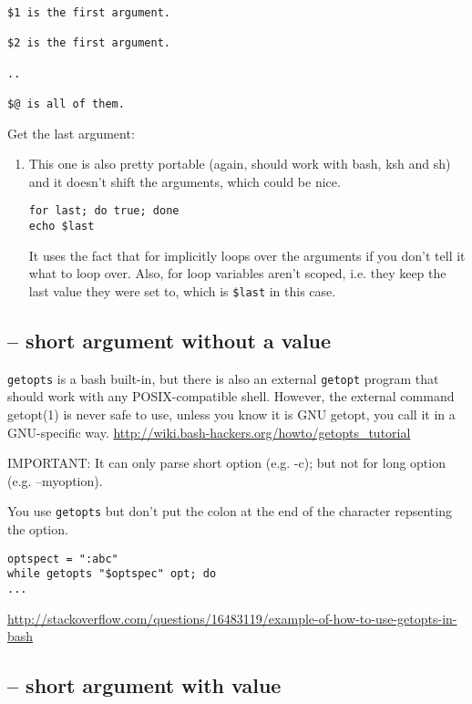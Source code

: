 
\begin{verbatim}
$1 is the first argument.

$2 is the first argument.

..

$@ is all of them.
\end{verbatim}

Get the last argument:
\begin{enumerate}
  \item  This one is also pretty portable (again, should work with bash, ksh and
  sh) and it doesn't shift the arguments, which could be nice.
\begin{verbatim}
for last; do true; done
echo $last
\end{verbatim}

It uses the fact that for implicitly loops over the arguments if you don't tell
it what to loop over. 
Also,  for loop variables aren't scoped, i.e. they keep the last value they were
set to, which is \verb!$last! in this case.
\end{enumerate}

\subsection{-- short argument without a value}

\verb!getopts! is a bash built-in, but there is also an external \verb!getopt!
program that should work with any POSIX-compatible shell.
However, the external command getopt(1) is never safe to use, unless you know it
is GNU getopt, you call it in a GNU-specific way.
\url{http://wiki.bash-hackers.org/howto/getopts_tutorial}

IMPORTANT: It can only parse short option (e.g. -c); but not for long option
(e.g. --myoption).

You use \verb!getopts! but don't put the colon at the end of the character
repsenting the option.
\begin{verbatim}
optspect = ":abc"
while getopts "$optspec" opt; do
...
\end{verbatim}

\url{http://stackoverflow.com/questions/16483119/example-of-how-to-use-getopts-in-bash}

\subsection{-- short argument with value}

